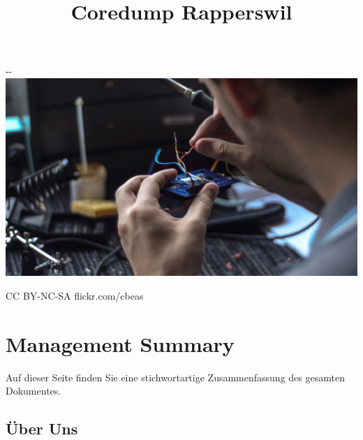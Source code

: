 \documentclass[10pt,a4paper,parskip,fleqn]{scrartcl}
\title{\Huge Coredump Rapperswil}
\begin{document}
\begin{titlepage}

	\maketitle

	\vspace{2cm}

	\begin{adjustwidth}{-\oddsidemargin-1in}{-\rightmargin-1in}
		\includegraphics[width=\paperwidth]{img/soldering.jpg}

		\vspace{-12mm}

		\hfill {\scriptsize \color{light-gray} CC BY-NC-SA flickr.com/cbeas}
	\end{adjustwidth}

	\vfill

\end{titlepage}

\section{Management Summary}

Auf dieser Seite finden Sie eine stichwortartige Zusammenfassung des gesamten
Dokumentes.

\subsection{Über Uns}
\end{document}
